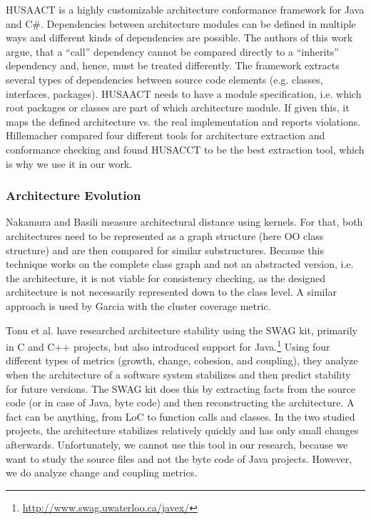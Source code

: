 \documentclass[sigconf, anonymous, review]{acmart}
\begin{document}
HUSAACT \cite{Husacct1,Husacct2} is a highly customizable architecture conformance framework for Java and C\#. Dependencies between architecture modules can be defined in multiple ways and different kinds of dependencies are possible. The authors of this work argue, that a ``call'' dependency cannot be compared directly to a ``inherits'' dependency and, hence, must be treated differently. 
The framework extracts several types of dependencies between source code elements (e.g. classes, interfaces, packages). HUSAACT needs to have a module specification, i.e. which root packages or classes are part of which architecture module. If given this, it maps the defined architecture vs. the real implementation and reports violations.
Hillemacher \cite{MScSteffen} compared four different tools for architecture extraction and conformance checking and found HUSACCT to be the best extraction tool, which is why we use it in our work.

\subsubsection{Architecture Evolution}

Nakamura and Basili \cite{StructDist} measure architectural distance using kernels. For that, both architectures need to be represented as a graph structure (here OO class structure) and are then compared for similar substructures. 
Because this technique works on the complete class graph and not an abstracted version, i.e. the architecture, it is not viable for consistency checking, as the designed architecture is not necessarily represented down to the class level. 
A similar approach is used by Garcia \cite{arcade-thesis} with the cluster coverage metric.



Tonu et al. \cite{Swag} have researched architecture stability using the SWAG kit, primarily in C and C++ projects, but also introduced support for Java.\footnote{\url{http://www.swag.uwaterloo.ca/javex/}} Using four different types of metrics (growth, change, cohesion, and coupling), they analyze when the architecture of a software system stabilizes and then predict stability for future versions. The SWAG kit does this by extracting facts from the source code (or in case of Java, byte code) and then reconstructing the architecture. A fact can be anything, from LoC to function calls and classes. 
In the two studied projects, the architecture stabilizes relatively quickly and has only small changes afterwards. Unfortunately, we cannot use this tool in our research, because we want to study the source files and not the byte code of Java projects. However, we do analyze change and coupling metrics.
\end{document}
